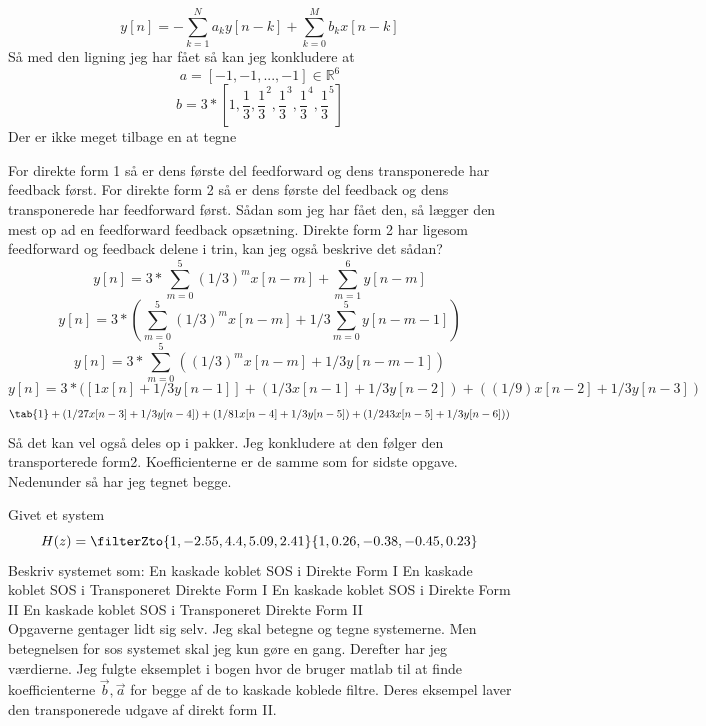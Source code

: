 \begin{Opgaver}
\begin{kapitel}
\begin{Opgave}[Opgave 9.3]
\begin{UnderOpgave}
                \[y[n] = -\sum_{k=1}^{N}a_{k}y[n-k] + \sum_{k = 0}^{M}{b_k x[n - k]}\]
                Så med den ligning jeg har fået så kan jeg konkludere at 
                \[a = [-1, -1, ..., -1]\in\mathbb{R}^6\]
                \[b = 3 * [1, \frac{1}{3}, \frac{1}{3}^2, \frac{1}{3}^3, \frac{1}{3}^4, \frac{1}{3}^5]\]
                Der er ikke meget tilbage en at tegne
            \end{UnderOpgave}
            \begin{UnderOpgave}
                For direkte form 1 så er dens første del feedforward og dens transponerede har feedback først. 
                For direkte form 2 så er dens første del feedback og dens transponerede har feedforward først. 
                Sådan som jeg har fået den, så lægger den mest op ad en feedforward feedback opsætning. 
                Direkte form 2 har ligesom feedforward og feedback delene i trin, kan jeg også beskrive det sådan? 
                \[y[n] = 3 * \sum_{m = 0}^{5}{(1/3)^m x[n - m]} + \sum_{m = 1}^{6}{y[n - m]}\]
                \[y[n] = 3 * (\sum_{m = 0}^{5}{(1/3)^m x[n - m]} + 1/3\sum_{m = 0}^{5}{y[n - m - 1]} )\]
                \[y[n] = 3 * \sum_{m = 0}^{5}{((1/3)^m x[n - m] + 1/3y[n - m - 1])}\]
                \[y[n] = 3 * ([1x[n] + 1/3y[n - 1]] + (1/3x[n - 1] + 1/3y[n - 2]) + ((1/9)x[n - 2] + 1/3y[n - 3])\]
                \[\tab{1} + (1/27x[n - 3] + 1/3y[n - 4]) + (1/81x[n - 4] + 1/3y[n - 5]) + (1/243x[n - 5] + 1/3y[n - 6]))\] 
                Så det kan vel også deles op i pakker. Jeg konkludere at den følger den transporterede form2. Koefficienterne er de samme som for sidste opgave.
                Nedenunder så har jeg tegnet begge. 
            \end{UnderOpgave}
        \end{Opgave}
        \clearpage
        \begin{Opgave}
            Givet et system 
            \[H(z) = \filterZto{1, -2.55, 4.4, 5.09, 2.41}{1, 0.26, -0.38, -0.45, 0.23}\]
            Beskriv systemet som: 
            En kaskade koblet SOS i Direkte Form I
            En kaskade koblet SOS i Transponeret Direkte Form I
            En kaskade koblet SOS i Direkte Form II
            En kaskade koblet SOS i Transponeret Direkte Form II\\

            Opgaverne gentager lidt sig selv. Jeg skal betegne og tegne systemerne.
            Men betegnelsen for sos systemet skal jeg kun gøre en gang. Derefter har jeg værdierne. 
            Jeg fulgte eksemplet i bogen hvor de bruger matlab til at finde koefficienterne $\vec{b}, \vec{a}$ for begge af de to kaskade koblede filtre.
            Deres eksempel laver den transponerede udgave af direkt form II.\\


\end{Opgave}
\end{kapitel}
\end{Opgaver}
